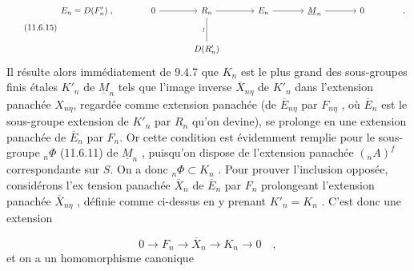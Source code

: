 \begin{equation}\tag{11.6.15}
\begin{tikzcd}[column sep=large, row sep=large]
E_n = D(F'_n) \; , & 0 \arrow[r] & R_n \arrow[r] \arrow[d, dash, "\wr"'] & E_n \arrow[r] & \underline{M}_n \arrow[r] & 0 & . \\
& & D(R'_n) & & & &
\end{tikzcd}
\end{equation}
Il résulte alors immédiatement de 9.4.7 que $K_n$ est le plus grand des sous-groupes finis étales $K'_n$ de $\underline{M}_n$ tels que l'image inverse $\overline{X}_{n\eta}$ de $K'_n$ dans l'extension panachée $X_{n\eta}$, regardée comme extension panachée (de $\overline{E}_{n\eta}$ par $F_{n\eta}$ , où $\overline{E}_n$ est le sous-groupe extension de $K'_n$ par $R_n$ qu'on devine), se prolonge en une extension panachée de $\overline{E}_n$ par $F_n$. Or cette condition est évidemment remplie pour le sous-groupe ${}_n\Phi$ (11.6.11) de $\underline{M}_n$ , puisqu'on dispose de l'extension panachée $({}_nA)^f$ correspondante sur $S$. On a donc ${}_n\Phi \subset K_n$ . Pour prouver l'inclusion opposée, considérons l'ex%
tension panachée $\overline{X}_n$ de $\overline{E}_n$ par $F_n$ prolongeant l'extension panachée $\overline{X}_{n\eta}$ , définie comme ci-dessus en y prenant $K'_n = K_n$ . C'est donc une extension

\begin{equation*}
0 \longrightarrow F_n \longrightarrow \overline{X}_n \longrightarrow K_n \longrightarrow 0 \quad ,
\end{equation*}
et on a un homomorphisme canonique

